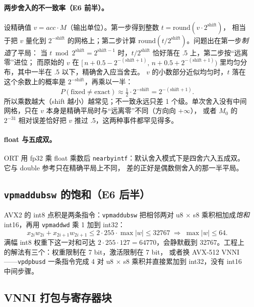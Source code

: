 \documentclass[11pt,a4paper]{ctexart}
\begin{document}
\paragraph{两步舍入的不一致率（E6 前半）。} 设精确值 $v = acc\cdot M$（输出单位）。第一步得到整数 $t=\mathrm{round}(v\cdot 2^{\mathrm{shift}})$，
相当于把 $v$ 量化到 $2^{-\mathrm{shift}}$ 的网格上；第二步计算 $\mathrm{round}(t/2^{\mathrm{shift}})$。问题出在第一步\emph{制造}了平局：
当 $t \bmod 2^{\mathrm{shift}} = 2^{\mathrm{shift}-1}$ 时，$t/2^{\mathrm{shift}}$ 恰好落在 .5 上，第二步按“远离零”进位；
而原始的 $v$ 在 $[\,n+0.5-2^{-(\mathrm{shift}+1)},\, n+0.5+2^{-(\mathrm{shift}+1)})$ 里均匀分布，其中一半在 .5 以下，精确舍入应当舍去。
$v$ 的小数部分近似均匀时，$t$ 落在这个余数上的概率是 $2^{-\mathrm{shift}}$，再乘以一半：
\begin{equation}
P(\text{fixed}\neq\text{exact}) \approx \tfrac12\cdot 2^{-\mathrm{shift}} = 2^{-(\mathrm{shift}+1)}.
\label{eq:double}
\end{equation}
所以乘数越大（shift 越小）越常见；不一致永远只差 1 个级。单次舍入没有中间网格，只在 $v$ 本身是精确平局时与“远离零”不同（方向向 $+\infty$），
或者 $M_0$ 的 $2^{-31}$ 相对误差恰好把 $v$ 推过 .5，这两种事件都罕见得多。

\paragraph{float 与五成双。} ORT 用 fp32 乘 float 乘数后 \texttt{nearbyintf}：默认舍入模式下是四舍六入五成双。它与 double 参考只在精确平局上不同，
差的正好是偶数侧舍入的那一半平局。

\subsection{\texttt{vpmaddubsw} 的饱和（E6 后半）}

AVX2 的 int8 点积是两条指令：\texttt{vpmaddubsw} 把相邻两对 u8 $\times$ s8 乘积相加成\emph{饱和} int16，再用 \texttt{vpmaddwd} 乘 1 加到 int32：
\begin{equation}
x_{2i}w_{2i} + x_{2i+1}w_{2i+1} \le 2\cdot 255\cdot \max|w| \le 32767 \;\Longrightarrow\; \max|w| \le 64.
\label{eq:sat}
\end{equation}
满幅 int8 权重下这一对和可达 $2\cdot 255\cdot 127 = 64770$，会静默截到 32767。工程上的解法有三个：权重限制在 7 bit，激活限制在 7 bit，
或者换 AVX-512 VNNI——\texttt{vpdpbusd} 一条指令完成 4 对 u8 $\times$ s8 乘积并直接累加到 int32，没有 int16 中间步骤。

\subsection{VNNI 打包与寄存器块}\label{sec:pack}
\end{document}
